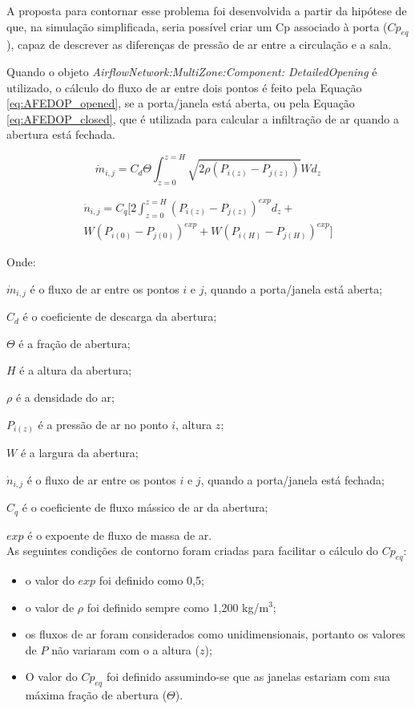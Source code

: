 \documentclass[brazil,hardcopy,openany,a5paper]{ufscthesis}
\begin{document}
		A proposta para contornar esse problema foi desenvolvida a partir da hipótese de que, na simulação simplificada, seria possível criar um Cp associado à porta ($Cp_{eq}$), capaz de descrever as diferenças de pressão de ar entre a circulação e a sala.  %
		
		Quando o objeto \textit{AirflowNetwork:MultiZone:Component: DetailedOpening} é utilizado, o cálculo do fluxo de ar entre dois pontos é feito pela Equação \ref{eq:AFEDOP_opened}, se a porta/janela está aberta, ou pela Equação \ref{eq:AFEDOP_closed}, que é utilizada para calcular a infiltração de ar quando a abertura está fechada.
		
		\begin{equation}
		\label{eq:AFEDOP_opened}
		\dot{m}_{i,j} = C_d \Theta 	\int_{z=0}^{z=H} \sqrt{2 \rho (P_{i(z)} - P_{j(z)})} W d_z 
		\end{equation}
		
		\begin{equation}
		\label{eq:AFEDOP_closed}
		\begin{split}
		\dot{n}_{i,j} = C_q [2\int_{z=0}^{z=H} {(P_{i(z)} - P_{j(z)})}^{exp} d_z + \\ W{(P_{i(0)} - P_{j(0)})}^{exp} + W{(P_{i(H)} - P_{j(H)})}^{exp}]
		\end{split}
		\end{equation}
		
		Onde:
		
		$\dot{m}_{i,j}$ é o fluxo de ar entre os pontos $i$ e $j$, quando a porta/janela está aberta;
		
		$C_d$ é o coeficiente de descarga da abertura;
		
		$\Theta$ é a fração de abertura;
		
		$H$ é a altura da abertura;
		
		$\rho$ é a densidade do ar;
		
		$P_{i(z)}$ é a pressão de ar no ponto $i$, altura $z$;
		
		$W$ é a largura da abertura;
		
		$\dot{n}_{i,j}$ é o fluxo de ar entre os pontos $i$ e $j$, quando a porta/janela está fechada;
		
		$C_q$ é o coeficiente de fluxo mássico de ar da abertura;
		
		$exp$ é o expoente de fluxo de massa de ar.
		\\
		
		As seguintes condições de contorno foram criadas para facilitar o cálculo do $Cp_{eq}$:
		\begin{itemize}			 
			\item o valor do $exp$ foi definido como 0,5;
			\item o valor de $\rho$ foi definido sempre como 1,200 kg/m$^3$;
			\item os fluxos de ar foram considerados como unidimensionais, portanto os valores de $P$ não variaram com o a altura ($z$);
			\item O valor do $Cp_{eq}$ foi definido assumindo-se que as janelas estariam com sua máxima fração de abertura ($\Theta$).
		\end{itemize}
		
\end{document}
